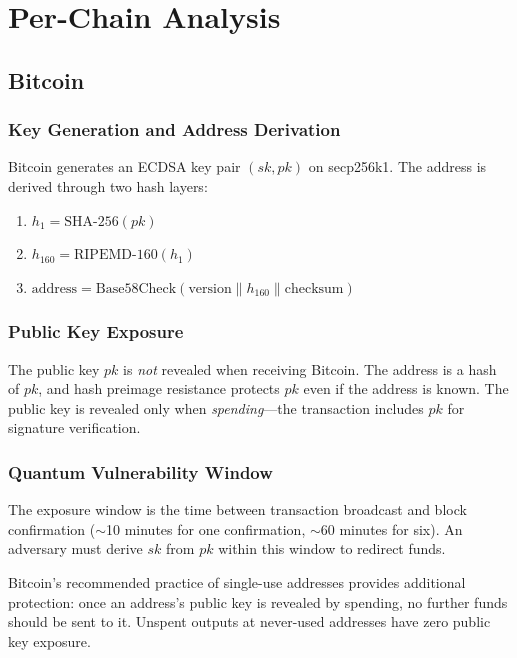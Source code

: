 \section{Per-Chain Analysis}


\subsection{Bitcoin}

\subsubsection{Key Generation and Address Derivation}

Bitcoin generates an ECDSA key pair $(sk, pk)$ on secp256k1. The
address is derived through two hash layers:

\begin{enumerate}[nosep]
  \item $h_1 = \text{SHA-256}(pk)$
  \item $h_{160} = \text{RIPEMD-160}(h_1)$
  \item $\text{address} = \text{Base58Check}(\text{version} \| h_{160}
        \| \text{checksum})$
\end{enumerate}

\subsubsection{Public Key Exposure}

The public key $pk$ is \emph{not} revealed when receiving Bitcoin. The
address is a hash of $pk$, and hash preimage resistance protects $pk$
even if the address is known. The public key is revealed only when
\emph{spending}---the transaction includes $pk$ for signature
verification.

\subsubsection{Quantum Vulnerability Window}

The exposure window is the time between transaction broadcast and
block confirmation ($\sim$10 minutes for one confirmation, $\sim$60
minutes for six). An adversary must derive $sk$ from $pk$ within this
window to redirect funds.

\begin{remark}
Bitcoin's recommended practice of single-use addresses provides
additional protection: once an address's public key is revealed by
spending, no further funds should be sent to it. Unspent outputs at
never-used addresses have zero public key exposure.
\end{remark}

